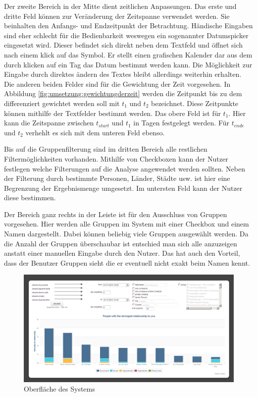Der zweite Bereich in der Mitte dient zeitlichen Anpassungen. Das erste und dritte Feld können zur Veränderung der Zeitspanne verwendet werden. Sie beinhalten den Anfangs- und Endzeitpunkt der Betrachtung. Händische Eingaben sind eher schlecht für die Bedienbarkeit weswegen ein sogenannter Datumspicker eingesetzt wird. Dieser befindet sich direkt neben dem Textfeld und öffnet sich nach einem klick auf das Symbol. Er stellt einen grafischen Kalender dar aus dem durch klicken auf ein Tag das Datum bestimmt werden kann. Die Möglichkeit zur Eingabe durch direktes ändern des Textes bleibt allerdings weiterhin erhalten. Die anderen beiden Felder sind für die Gewichtung der Zeit vorgesehen. In Abbildung \ref{fig:umsetzung:gewichtungderzeit} werden die Zeitpunkt bis zu dem differenziert gewichtet werden soll mit $t_1$ und $t_2$ bezeichnet. Diese Zeitpunkte können mithilfe der Textfelder bestimmt werden. Das obere Feld ist für $t_1$. Hier kann die Zeitspanne zwischen $t_{start}$ und $t_1$ in Tagen festgelegt werden. Für $t_{ende}$ und $t_2$ verhehlt es sich mit dem unteren Feld ebenso.

Bis auf die Gruppenfilterung sind im dritten Bereich alle restlichen Filtermöglichkeiten vorhanden. Mithilfe von Checkboxen kann der Nutzer festlegen welche Filterungen auf die Analyse angewendet werden sollten. Neben der Filterung durch bestimmte Personen, Länder, Städte usw. ist hier eine Begrenzung der Ergebnismenge umgesetzt. Im untersten Feld kann der Nutzer diese bestimmen.

Der Bereich ganz rechts in der Leiste ist für den Ausschluss von Gruppen vorgesehen. Hier werden alle Gruppen im System mit einer Checkbox und einem Namen dargestellt. Dabei können beliebig viele Gruppen ausgewählt werden. Da die Anzahl der Gruppen überschaubar ist entschied man sich alle anzuzeigen anstatt einer manuellen Eingabe durch den Nutzer. Das hat auch den Vorteil, dass der Benutzer Gruppen sieht die er eventuell nicht exakt beim Namen kennt.     

\begin{figure}[htbp]
\centering
\includegraphics[width=\textwidth]{pics/final_screen.png}
\caption{Oberfläche des Systems}
\label{ergebniss_oberflaeche_haupt}
\end{figure}

